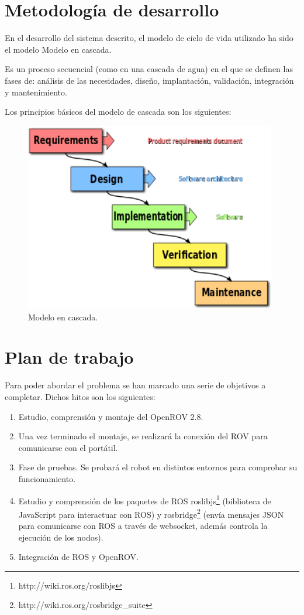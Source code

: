 \section{Metodología de desarrollo}
\label{sec:metodologiadedesarrollo}

En el desarrollo del sistema descrito, el modelo de ciclo de vida utilizado ha sido el modelo Modelo en cascada\cite{cascada}.

Es un proceso secuencial (como en una cascada de agua) en el que se definen las fases de: análisis de las necesidades, diseño, implantación, validación, integración y mantenimiento. 

Los principios básicos del modelo de cascada son los siguientes:
\begin{figure} [hbtp]
  \begin{center}
    \includegraphics[width=11cm]{img/cap2/Waterfall_model}
  \end{center}
  \caption{Modelo en cascada.}
  \label{fig:Waterfall_model}
\end{figure}
\newpage

\section{Plan de trabajo}
\label{sec:plandetrabajo}

Para poder abordar el problema se han marcado una serie de objetivos a completar. Dichos hitos son los siguientes:

\begin{enumerate}
\item Estudio, comprensión y montaje del OpenROV 2.8.
\item Una vez terminado el montaje, se realizará la conexión del ROV para comunicarse con el portátil.
\item Fase de pruebas. Se probará el robot en distintos entornos para comprobar su funcionamiento.
\item Estudio y comprensión de los paquetes de ROS roslibjs\footnote{http://wiki.ros.org/roslibjs} (biblioteca de JavaScript para interactuar con ROS) y rosbridge\footnote{http://wiki.ros.org/rosbridge\_suite} (envía mensajes JSON para comunicarse con ROS a través de websocket, además controla la ejecución de los nodos).
\item Integración de ROS y OpenROV.
\end{enumerate}